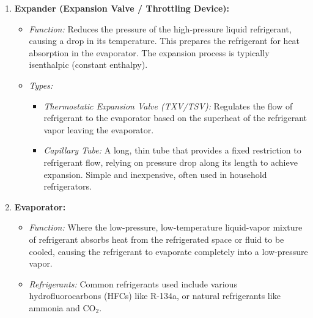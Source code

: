 \begin{enumerate}
\begin{itemize}
                \begin{itemize}
                    \item \textit{Air-Cooled Condensers:} Use fans to blow air over the condenser coils. Common in residential air conditioners.
                    \item \textit{Water-Cooled Condensers:} Use cooling water (often from a cooling tower) to absorb heat. Common in large commercial and industrial systems.
                    \item \textit{Evaporative Condensers:} Combine aspects of air-cooled and water-cooled, using both air and evaporative cooling of water to reject heat.
                \end{itemize}
        \end{itemize}
    \item \textbf{Expander (Expansion Valve / Throttling Device):}
        \begin{itemize}
            \item \textit{Function:} Reduces the pressure of the high-pressure liquid refrigerant, causing a drop in its temperature. This prepares the refrigerant for heat absorption in the evaporator. The expansion process is typically isenthalpic (constant enthalpy).
            \item \textit{Types:}
                \begin{itemize}
                    \item \textit{Thermostatic Expansion Valve (TXV/TSV):} Regulates the flow of refrigerant to the evaporator based on the superheat of the refrigerant vapor leaving the evaporator.
                    \item \textit{Capillary Tube:} A long, thin tube that provides a fixed restriction to refrigerant flow, relying on pressure drop along its length to achieve expansion. Simple and inexpensive, often used in household refrigerators.
                \end{itemize}
        \end{itemize}
    \item \textbf{Evaporator:}
        \begin{itemize}
            \item \textit{Function:} Where the low-pressure, low-temperature liquid-vapor mixture of refrigerant absorbs heat from the refrigerated space or fluid to be cooled, causing the refrigerant to evaporate completely into a low-pressure vapor.
            \item \textit{Refrigerants:} Common refrigerants used include various hydrofluorocarbons (HFCs) like R-134a, or natural refrigerants like ammonia and CO$_2$.
        \end{itemize}
\end{enumerate}

